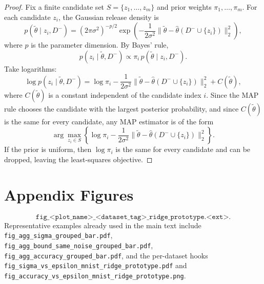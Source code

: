 \documentclass[conference,compsoc]{IEEEtran}
\begin{document}
\begin{proof}
Fix a finite candidate set $S=\{z_1,\dots,z_m\}$ and prior weights $\pi_1,\dots,\pi_m$. For each candidate $z_i$, the Gaussian release density is
\[
p(\widetilde\theta\mid z_i,D^-)
=
(2\pi\sigma^2)^{-p/2}
\exp\!\left(
-\frac{1}{2\sigma^2}\bigl\|\widetilde\theta-\widehat\theta(D^-\cup\{z_i\})\bigr\|_2^2
\right),
\]
where $p$ is the parameter dimension. By Bayes' rule,
\[
p(z_i\mid \widetilde\theta,D^-)
\propto
\pi_i\,p(\widetilde\theta\mid z_i,D^-).
\]
Take logarithms:
\[
\log p(z_i\mid \widetilde\theta,D^-)
=
\log \pi_i
-
\frac{1}{2\sigma^2}\bigl\|\widetilde\theta-\widehat\theta(D^-\cup\{z_i\})\bigr\|_2^2
+
C(\widetilde\theta),
\]
where $C(\widetilde\theta)$ is a constant independent of the candidate index $i$. Since the MAP rule chooses the candidate with the largest posterior probability, and since $C(\widetilde\theta)$ is the same for every candidate, any MAP estimator is of the form
\[
\arg\max_{z_i\in S}
\left\{
\log \pi_i
-
\frac{1}{2\sigma^2}\bigl\|\widetilde\theta-\widehat\theta(D^-\cup\{z_i\})\bigr\|_2^2
\right\}.
\]
If the prior is uniform, then $\log \pi_i$ is the same for every candidate and can be dropped, leaving the least-squares objective.
\end{proof}


\section{Appendix Figures}
\label{app:figures}

\[
\texttt{fig\_<plot\_name>\_<dataset\_tag>\_ridge\_prototype.<ext>}.
\]
Representative examples already used in the main text include
\texttt{fig\_agg\_sigma\_grouped\_bar.pdf},
\texttt{fig\_agg\_bound\_same\_noise\_grouped\_bar.pdf},
\texttt{fig\_agg\_accuracy\_grouped\_bar.pdf}, and the per-dataset hooks
\texttt{fig\_sigma\_vs\_epsilon\_mnist\_ridge\_prototype.pdf} and
\texttt{fig\_accuracy\_vs\_epsilon\_mnist\_ridge\_prototype.png}.
\end{document}
